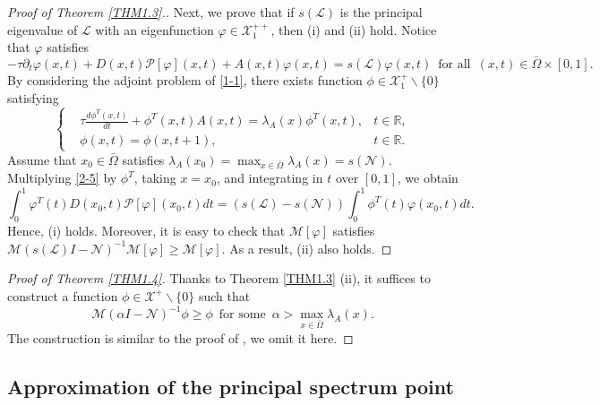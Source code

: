 \documentclass[11pt,reqno]{amsart}
\numberwithin{equation}{section}
\begin{document}
\begin{proof}[Proof of Theorem \ref{THM1.3}.]
Next, we prove that if $s(\mathcal{L})$ is the principal eigenvalue of $\mathcal{L}$ with an eigenfunction $\varphi \in \mathcal{X}^{++}_{1}$, then (i) and (ii) hold.
Notice that $\varphi$ satisfies
\begin{equation}\label{2-5}
-\tau \partial_{t} \varphi(x,t) + D(x,t)\mathcal{P}[\varphi](x,t) + A(x,t)\varphi(x,t) = s(\mathcal{L})\varphi(x,t)
\enspace \text{for all} \enspace (x,t)\in\bar{\Omega}\times[0,1].
\end{equation}
By considering the adjoint problem of \eqref{1-1}, there exists function $\phi\in\mathcal{X}_{1}^{+}\backslash
\{ 0 \}$ satisfying
\begin{equation}
\left\{
\begin{aligned}
& \tau\frac{d\phi^{T}(x,t)}{dt}+ \phi^{T}(x,t)A(x,t) =\lambda_{A}(x)\phi^{T}(x,t), &t\in\mathbb{R},\\
&\phi(x,t)=\phi(x,t+1), &t\in\mathbb{R}.
\end{aligned}
\right.
\end{equation}
Assume that $x_{0}\in\bar{\Omega}$ satisfies $\lambda_{A}(x_{0}) = \max_{x\in\bar{\Omega}} \lambda_{A}(x)=s(\mathcal{N})$.
Multiplying \eqref{2-5} by $\phi^{T}$, taking $x=x_{0}$,
and integrating in $t$ over $[0,1]$, we obtain
\begin{equation*}
\int_{0}^{1}\varphi^{T}(t)D(x_{0},t)\mathcal{P}[\varphi](x_{0},t)dt
=
(s(\mathcal{L})-s(\mathcal{N}))
\int_{0}^{1} \phi^{T}(t)\varphi(x_{0},t)dt.
\end{equation*}
Hence, (i) holds.
Moreover, it is easy to check that $\mathcal{M}[\varphi]$ satisfies $\mathcal{M}(s(\mathcal{L})I - \mathcal{N})^{-1} \mathcal{M}[\varphi] \geq \mathcal{M}[\varphi]$.
As a result, (ii) also holds.
\end{proof}


\begin{proof}[Proof of Theorem \ref{THM1.4}]
Thanks to Theorem \ref{THM1.3} (ii), it suffices to construct a function $\phi\in\mathcal{X}^{+}\backslash\{ 0\}$ such that
\begin{equation*}
\mathcal{M}(\alpha I - \mathcal{N})^{-1}\phi \geq \phi
\enspace \text{for some} \enspace
\alpha > \max_{x\in\bar{\Omega}} \lambda_{A}(x).
\end{equation*}
The construction is similar to the proof of \cite[Proposition 3.4]{BSS17}, we omit it here.
\end{proof}


\subsection{Approximation of the principal spectrum point}
\indent
\end{document}
